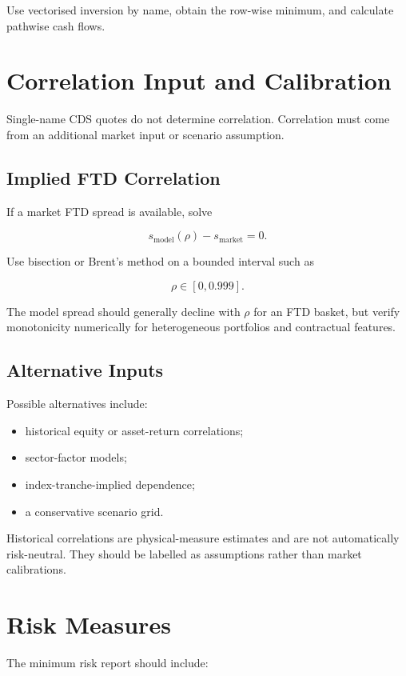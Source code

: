 \documentclass[11pt,a4paper]{article}
\begin{document}
Use vectorised inversion by name, obtain the row-wise minimum, and calculate pathwise cash flows.

\section{Correlation Input and Calibration}

Single-name CDS quotes do not determine correlation. Correlation must come from an additional market input or scenario assumption.

\subsection{Implied FTD Correlation}

If a market FTD spread is available, solve

\[
s_{\mathrm{model}}(\rho)
-
s_{\mathrm{market}}
=
0.
\]

Use bisection or Brent's method on a bounded interval such as

\[
\rho\in[0,0.999].
\]

The model spread should generally decline with $\rho$ for an FTD basket, but verify monotonicity numerically for heterogeneous portfolios and contractual features.

\subsection{Alternative Inputs}

Possible alternatives include:

\begin{itemize}
    \item historical equity or asset-return correlations;
    \item sector-factor models;
    \item index-tranche-implied dependence;
    \item a conservative scenario grid.
\end{itemize}

Historical correlations are physical-measure estimates and are not automatically risk-neutral. They should be labelled as assumptions rather than market calibrations.

\section{Risk Measures}

The minimum risk report should include:
\end{document}

